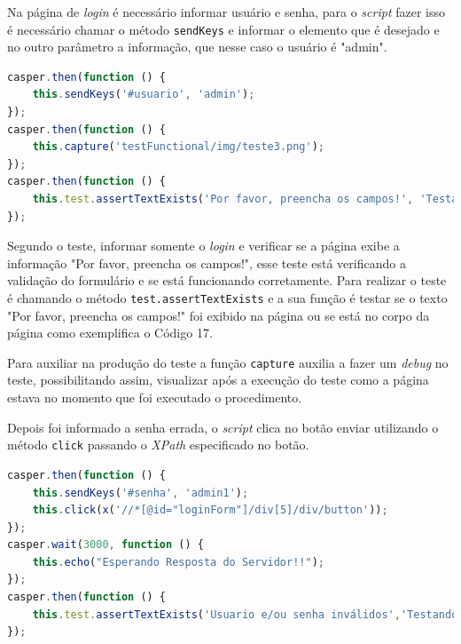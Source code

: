 \par Na página de \textit{login} é necessário informar usuário e senha, para o \textit{script} fazer isso é necessário chamar o método \texttt{sendKeys} e informar o elemento que é desejado e no outro parâmetro a informação, que nesse caso o usuário é "admin".


\begin{lstlisting}[language=JavaScript, caption={[Teste que verifica a validação da página.]{Teste que verifica a validação da página. \textbf{Fonte:} Elaborado pelos autores.}}]
casper.then(function () {
    this.sendKeys('#usuario', 'admin');
});
casper.then(function () {
    this.capture('testFunctional/img/teste3.png');
});
casper.then(function () {
    this.test.assertTextExists('Por favor, preencha os campos!', 'Testando se no corpo da pagina contém a frase "Por favor, preencha os campos!"');
});
\end{lstlisting}

\par Segundo o teste, informar somente o \textit{login} e verificar se a página exibe a informação "Por favor, preencha os campos!", esse teste está verificando a validação do formulário e se está funcionando corretamente. Para realizar o teste é chamando o método \texttt{test.assertTextExists} e a sua função é testar se o texto "Por favor, preencha os campos!" foi exibido na página ou se está no corpo da página como exemplifica o Código 17.

\par Para auxiliar na produção do teste a função \texttt{capture} auxilia a fazer um \textit{debug} no teste, possibilitando assim, visualizar após a execução do teste como a página estava no momento que foi executado o procedimento.


\par Depois foi informado a senha errada, o \textit{script} clica no botão enviar utilizando o método \texttt{click} passando o \textit{XPath} especificado no botão.

\newpage

\begin{lstlisting}[language=JavaScript, caption={[Teste que verifica a validação da página novamente.]{Teste que verifica a validação da página novamente.  \textbf{Fonte:} Elaborado pelos autores.}}]
casper.then(function () {
    this.sendKeys('#senha', 'admin1');
    this.click(x('//*[@id="loginForm"]/div[5]/div/button'));
});
casper.wait(3000, function () {
    this.echo("Esperando Resposta do Servidor!!");
});
casper.then(function () {
    this.test.assertTextExists('Usuario e/ou senha inválidos','Testando se o usuário foi impedido de entrar e se a mensagem de alerta é a correta"');
});

\end{lstlisting}

